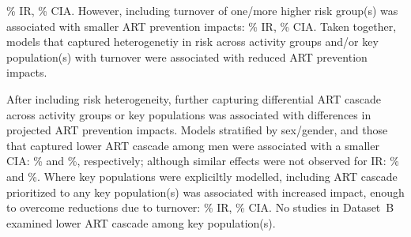 \% IR, \% CIA.
However, including turnover of one/more higher risk group(s)
was associated with smaller ART prevention impacts:
\% IR, \% CIA.
Taken together, models that captured heterogenetiy in risk across
activity groups and/or key population(s) with turnover were associated with reduced ART prevention impacts.
\par
After including risk heterogeneity,
further capturing differential ART cascade across activity groups or key populations
was associated with differences in projected ART prevention impacts.
Models stratified by sex/gender, and those that captured lower ART cascade among men
were associated with a smaller CIA:
\% and \%, respectively;
although similar effects were not observed for IR:
\% and \%.
Where key populations were expliciltly modelled,
including ART cascade prioritized to any key population(s)
was associated with increased impact, enough to overcome reductions due to turnover:
\% IR, \% CIA.
No studies in Dataset~B examined lower ART cascade among key population(s).